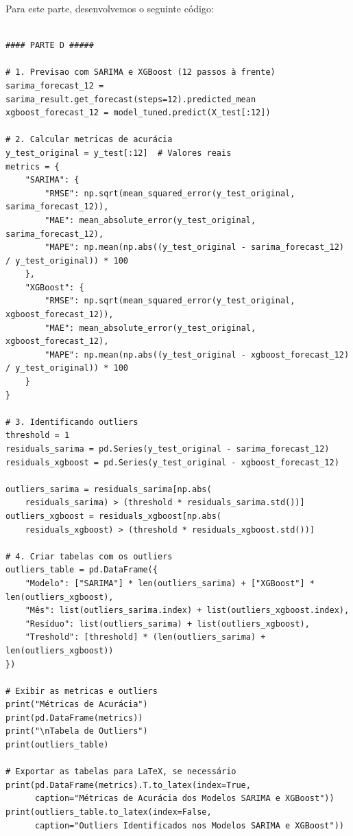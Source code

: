 \documentclass[a4paper, 12pt]{article}
\begin{document}
Para este parte, desenvolvemos o seguinte código:

\begin{lstlisting}[style=python]
    
#### PARTE D #####

# 1. Previsao com SARIMA e XGBoost (12 passos à frente)
sarima_forecast_12 = sarima_result.get_forecast(steps=12).predicted_mean
xgboost_forecast_12 = model_tuned.predict(X_test[:12])

# 2. Calcular metricas de acurácia
y_test_original = y_test[:12]  # Valores reais
metrics = {
    "SARIMA": {
        "RMSE": np.sqrt(mean_squared_error(y_test_original, sarima_forecast_12)),
        "MAE": mean_absolute_error(y_test_original, sarima_forecast_12),
        "MAPE": np.mean(np.abs((y_test_original - sarima_forecast_12) / y_test_original)) * 100
    },
    "XGBoost": {
        "RMSE": np.sqrt(mean_squared_error(y_test_original, xgboost_forecast_12)),
        "MAE": mean_absolute_error(y_test_original, xgboost_forecast_12),
        "MAPE": np.mean(np.abs((y_test_original - xgboost_forecast_12) / y_test_original)) * 100
    }
}

# 3. Identificando outliers
threshold = 1 
residuals_sarima = pd.Series(y_test_original - sarima_forecast_12)
residuals_xgboost = pd.Series(y_test_original - xgboost_forecast_12)

outliers_sarima = residuals_sarima[np.abs(
    residuals_sarima) > (threshold * residuals_sarima.std())]
outliers_xgboost = residuals_xgboost[np.abs(
    residuals_xgboost) > (threshold * residuals_xgboost.std())]

# 4. Criar tabelas com os outliers
outliers_table = pd.DataFrame({
    "Modelo": ["SARIMA"] * len(outliers_sarima) + ["XGBoost"] * len(outliers_xgboost),
    "Mês": list(outliers_sarima.index) + list(outliers_xgboost.index),
    "Resíduo": list(outliers_sarima) + list(outliers_xgboost),
    "Treshold": [threshold] * (len(outliers_sarima) + len(outliers_xgboost))
})

# Exibir as metricas e outliers
print("Métricas de Acurácia")
print(pd.DataFrame(metrics))
print("\nTabela de Outliers")
print(outliers_table)

# Exportar as tabelas para LaTeX, se necessário
print(pd.DataFrame(metrics).T.to_latex(index=True,
      caption="Métricas de Acurácia dos Modelos SARIMA e XGBoost"))
print(outliers_table.to_latex(index=False,
      caption="Outliers Identificados nos Modelos SARIMA e XGBoost"))
\end{lstlisting}
\end{document}
